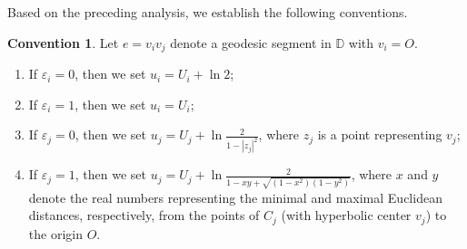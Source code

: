 \documentclass[12pt]{amsart}
\theoremstyle{definition}
\newtheorem{remark}[theorem]{Remark}
\newtheorem{convention}[theorem]{Convention}
\begin{document}

Based on the preceding analysis, we establish the following conventions.

\begin{convention}\label{Convention}
Let $e=v_iv_j$ denote a geodesic segment in $\mathbb{D}$ with $v_i=O$.
\begin{enumerate}
\item [(a)]
If $\varepsilon_i=0$, then we set $u_i=U_i+\ln 2$;
\item [(b)]
If $\varepsilon_i=1$, then we set $u_i=U_i$;
\item [(c)]
If $\varepsilon_j=0$, then we set $u_j=U_j+\ln\frac{2}{1-|z_j|^2}$,
where $z_j$ is a point representing $v_j$;
\item [(d)]
If $\varepsilon_j=1$, then we set $u_j=U_j+\ln \frac{2}{1-xy+\sqrt{(1-x^2)(1-y^2)}}$,
where $x$ and $y$ denote the real numbers representing the minimal and maximal Euclidean distances, respectively, from the points of $C_j$ (with hyperbolic center $v_j$) to the origin $O$.
\end{enumerate}
\end{convention}
\end{document}
